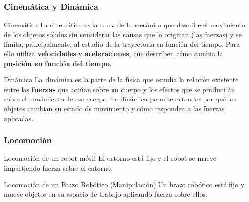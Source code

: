 \begin{frame}
    \frametitle{Cinemática y Dinámica}
    \begin{block}{Cinemática}
        La cinemática es la rama de la mecánica que describe el movimiento de los objetos sólidos sin considerar las causas que lo originan (las fuerzas) y se limita, principalmente, al estudio de la trayectoria en función del tiempo. Para ello utiliza \textbf{velocidades} y \textbf{aceleraciones}, que describen cómo cambia la \textbf{posición en función del tiempo}.
    \end{block}

    \begin{block}{Dinámica}
        La dinámica es la parte de la física que estudia la relación existente entre las \textbf{fuerzas} que actúan sobre un cuerpo y los efectos que se producirán sobre el movimiento de ese cuerpo. La dinámica permite entender por qué los objetos cambian su estado de movimiento y cómo responden a las fuerzas aplicadas.
    \end{block}


\end{frame}


\begin{frame}
    \frametitle{Locomoción}

    \begin{block}{Locomoción de un robot móvil}
		El entorno está fijo y el robot se mueve impartiendo fuerza sobre el entorno.
	\end{block}

	\begin{block}{Locomoción de un Brazo Robótico (Manipulación)}
    	Un brazo robótico está fijo y mueve objetos en su espacio de trabajo aplicando fuerza sobre ellos.
	\end{block}

\end{frame}


